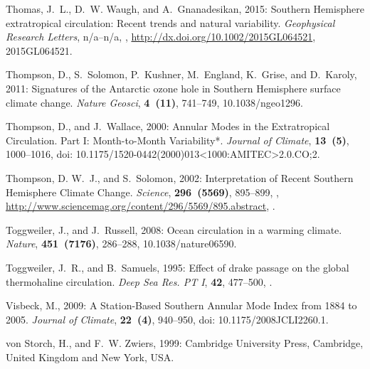 \documentclass{ametsoc}
\begin{document}
\begin{thebibliography}{53}
Thomas, J.~L., D.~W. Waugh, and A.~Gnanadesikan, 2015: {Southern Hemisphere
  extratropical circulation: Recent trends and natural variability}.
  \textit{Geophysical Research Letters}, n/a--n/a, ,
  \urlprefix\url{http://dx.doi.org/10.1002/2015GL064521}, 2015GL064521.

Thompson, D., S.~Solomon, P.~Kushner, M.~England, K.~Grise, and D.~Karoly,
  2011: {Signatures of the Antarctic ozone hole in Southern Hemisphere surface
  climate change}. \textit{Nature Geosci}, \textbf{4~(11)}, 741--749,
  10.1038/ngeo1296.

Thompson, D., and J.~Wallace, 2000: {Annular Modes in the Extratropical
  Circulation. Part I: Month-to-Month Variability*}. \textit{Journal of
  Climate}, \textbf{13~(5)}, 1000--1016, doi:
  10.1175/1520-0442(2000)013<1000:AMITEC>2.0.CO;2.

Thompson, D. W.~J., and S.~Solomon, 2002: {Interpretation of Recent Southern
  Hemisphere Climate Change}. \textit{Science}, \textbf{296~(5569)}, 895--899,
  ,
  \urlprefix\url{http://www.sciencemag.org/content/296/5569/895.abstract},
  .

Toggweiler, J., and J.~Russell, 2008: {Ocean circulation in a warming climate}.
  \textit{Nature}, \textbf{451~(7176)}, 286--288, 10.1038/nature06590.

Toggweiler, J.~R., and B.~Samuels, 1995: {Effect of drake passage on the global
  thermohaline circulation}. \textit{Deep {S}ea {R}es. PT I}, \textbf{42},
  477--500, .

Visbeck, M., 2009: {A Station-Based Southern Annular Mode Index from 1884 to
  2005}. \textit{Journal of Climate}, \textbf{22~(4)}, 940--950, doi:
  10.1175/2008JCLI2260.1.

von Storch, H., and F.~W. Zwiers, 1999: Cambridge University Press, Cambridge,
  United Kingdom and New York, USA.


\end{thebibliography}
\end{document}
